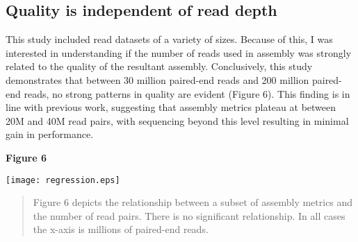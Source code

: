 \documentclass[10pt,letterpaper]{article}
\begin{document}
\subsection{Quality is independent of read depth}

This study included read datasets of a variety of sizes. Because of this, I was interested in understanding if the number of reads used in assembly was strongly related to the quality of the resultant assembly. Conclusively, this study demonstrates that between 30 million paired-end reads and 200 million paired-end reads, no strong patterns in quality are evident (Figure 6). This finding is in line with previous work, \citep{MacManes:2015iz} suggesting that assembly metrics plateau at between 20M and 40M read pairs, with sequencing beyond this level resulting in minimal gain in performance.  


\textbf{\hypertarget{Figure 6}{Figure 6}} \\
\centerline{\texttt{[image: regression.eps]}}
\begin{quote}
\small{Figure 6 depicts the relationship between a subset of assembly metrics and the number of read pairs. There is no significant relationship. In all cases the x-axis is millions of paired-end reads. }
\end{quote}



\end{document}
